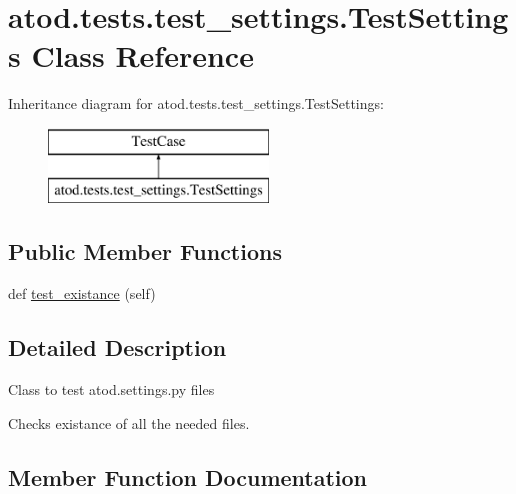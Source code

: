 \hypertarget{classatod_1_1tests_1_1test__settings_1_1_test_settings}{}\section{atod.\+tests.\+test\+\_\+settings.\+Test\+Settings Class Reference}
\label{classatod_1_1tests_1_1test__settings_1_1_test_settings}
Inheritance diagram for atod.\+tests.\+test\+\_\+settings.\+Test\+Settings\+:\begin{figure}[H]
\begin{center}
\leavevmode
\includegraphics[height=2.000000cm]{classatod_1_1tests_1_1test__settings_1_1_test_settings}
\end{center}
\end{figure}
\subsection*{Public Member Functions}
\begin{DoxyCompactItemize}
\item 
def \hyperlink{classatod_1_1tests_1_1test__settings_1_1_test_settings_a8faa49511d50365876e9576c4848c5cd}{test\+\_\+existance} (self)
\end{DoxyCompactItemize}


\subsection{Detailed Description}
\begin{DoxyVerb}Class to test atod.settings.py files

    Checks existance of all the needed files.
\end{DoxyVerb}
 

\subsection{Member Function Documentation}

